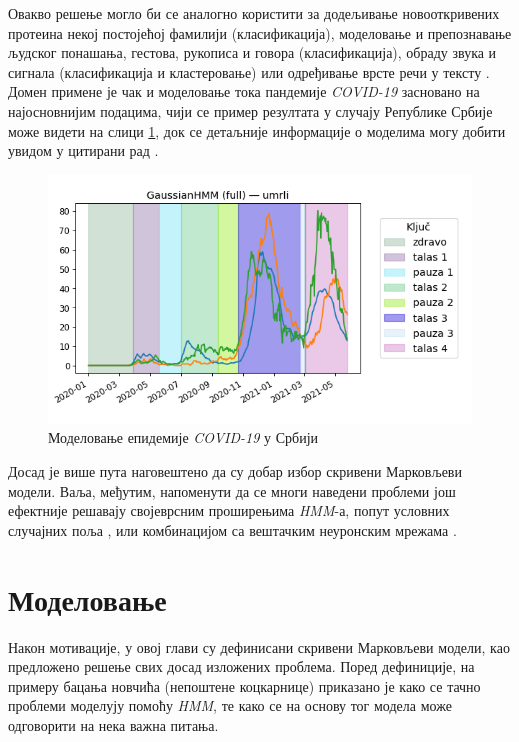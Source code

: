 \documentclass[12pt,oneside]{memoir}
\begin{document}
\begin{CJK}{UTF8}{ipxm}
Овакво решење могло би се аналогно користити за додељивање новооткривених протеина некој постојећој фамилији \cite{nguyen2016} (класификација), моделовање и препознавање људског понашања, гестова, рукописа и говора \cite{gales2007} (класификација), обраду звука и сигнала \cite{andreao2006} (класификација и кластеровање) или одређивање врсте речи у тексту \cite{jurafsky2020}. Домен примене је чак и моделовање тока пандемије \textit{COVID-19} засновано на најосновнијим подацима, чији се пример резултата у случају Републике Србије може видети на слици \ref{fig:covid}, док се детаљније информације о моделима могу добити увидом у цитирани рад \cite{vasovic2021}.

\begin{figure}[H]
  \centering
  \includegraphics[width=.8\textwidth]{covid.png}
  \caption{Моделовање епидемије \textit{COVID-19} у Србији \cite{vasovic2021}}
  \label{fig:covid}
\end{figure}

Досад је више пута наговештено да су добар избор скривени Марковљеви модели. Ваља, међутим, напоменути да се многи наведени проблеми још ефектније решавају својеврсним проширењима \textit{HMM}-а, попут условних случајних поља \cite{decaprio2007}, или комбинацијом са вештачким неуронским мрежама \cite{cohen1999}.

\chapter{Моделовање}
Након мотивације, у овој глави су дефинисани скривени Марковљеви модели, као предложено решење свих досад изложених проблема. Поред дефиниције, на примеру бацања новчића (непоштене коцкарнице) приказано је како се тачно проблеми моделују помоћу \textit{HMM}, те како се на основу тог модела може одговорити на нека важна питања.


\end{CJK}
\end{document}
